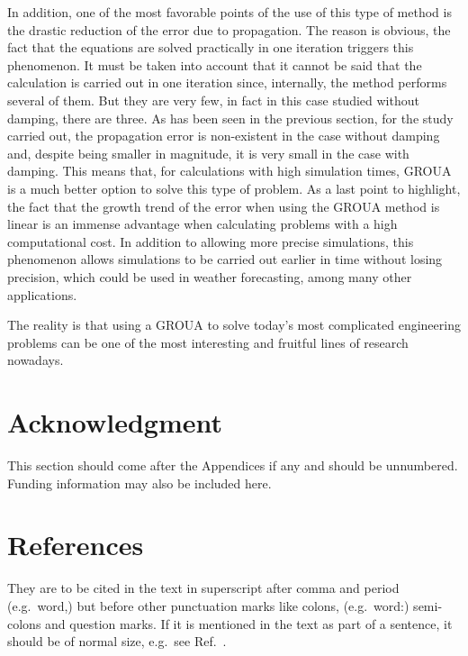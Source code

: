\documentclass{ws-m3as}
\begin{document}
In addition, one of the most favorable points of the use of this type of method is the drastic reduction of the error due to propagation. The reason is obvious, the fact that the equations are solved practically in one iteration triggers this phenomenon. It must be taken into account that it cannot be said that the calculation is carried out in one iteration since, internally, the method performs several of them. But they are very few, in fact in this case studied without damping, there are three.
As has been seen in the previous section, for the study carried out, the propagation error is non-existent in the case without damping and, despite being smaller in magnitude, it is very small in the case with damping. This means that, for calculations with high simulation times, GROUA is a much better option to solve this type of problem.
As a last point to highlight, the fact that the growth trend of the error when using the GROUA method is linear is an immense advantage when calculating problems with a high computational cost. In addition to allowing more precise simulations, this phenomenon allows simulations to be carried out earlier in time without losing precision, which could be used in weather forecasting, among many other applications.


The reality is that using a GROUA to solve today's most complicated engineering problems can be one of the most interesting and fruitful lines of research nowadays.\\


\section*{Acknowledgment}
This section should come after the Appendices if any and should
be unnumbered. Funding information may also be included here.

\section*{References}
They are to be cited in the text in superscript
after comma and period (e.g.~word,\cite{am})
but before other punctuation marks like colons,
(e.g.~word\cite{lar}:) semi-colons and\break
question marks. If it is mentioned in the text as part of a sentence,
it should be of normal size, e.g.~see Ref.~.
\end{document}
